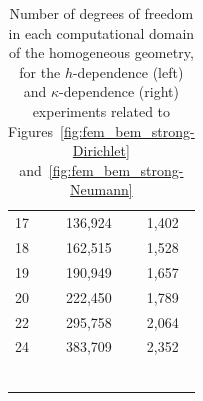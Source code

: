 \documentclass[a4paper,11pt]{article}
\begin{document}
\begin{appendix}
\begin{table}[ht]
{\begin{tabular}{lcc}
    \multicolumn{1}{l|}{17}         & 136,924    & 1,402      \\
    \multicolumn{1}{l|}{18}         & 162,515    & 1,528      \\
    \multicolumn{1}{l|}{19}         & 190,949    & 1,657      \\
    \multicolumn{1}{l|}{20}         & 222,450    & 1,789      \\
    \multicolumn{1}{l|}{22}         & 295,758    & 2,064      \\
    \multicolumn{1}{l|}{24}         & 383,709    & 2,352      \\
    &&\\
    &&\\
    &&\\
    &&\\
    &&\\
    &&
  \end{tabular}
  }
  \caption{Number of degrees of freedom in each computational domain of the homogeneous geometry, for the \(h\)-dependence (left) and \(\kappa\)-dependence (right) experiments related to Figures~\ref{fig:fem_bem_strong-Dirichlet} and~\ref{fig:fem_bem_strong-Neumann}}
  \label{table:dof_homogeneous}
\end{table}


\end{appendix}
\end{document}
